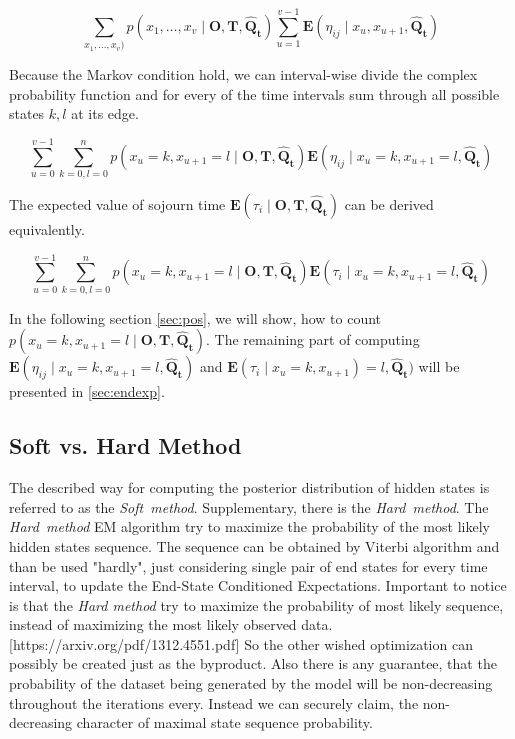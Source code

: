 \documentclass[thesis=M,english]{FITthesis}[2012/10/20]
\newcommand{\matr}[1]{\mathbf{#1}}
\begin{document}
\begin{equation}
 \sum_{x_1,\dots,x_v)} p(x_1,\dots,x_v \mid \matr{O},\matr{T}, \matr{ \hat Q_t }) \sum_{u=1}^{v-1}\mathbf{E}(\eta_{ij} \mid x_u, x_{u+1} ,\matr{\hat Q_t} )
\end{equation}

Because the Markov condition hold, we can interval-wise divide the complex probability function and for every of the time intervals sum through all possible states $k,l$ at its edge. 

\begin{equation}
\sum_{u=0}^{v-1} \sum_{k=0,l=0}^n p( x_u = k, x_{u+1} = l \mid \matr{O},\matr{T}, \matr{ \hat Q_t }) \mathbf{E}(\eta_{ij} \mid x_u = k, x_{u+1} = l, \matr{ \hat Q_t } )
\end{equation}

The expected value of sojourn time $\mathbf{E}( \tau_i \mid \matr{O},\matr{T}, \matr{ \hat Q_t } )$ can be derived equivalently.

\begin{equation}
\sum_{u=0}^{v-1} \sum_{k=0,l=0}^n p( x_u = k, x_{u+1} = l \mid \matr{O},\matr{T}, \matr{ \hat Q_t }) \mathbf{E}(\tau_i \mid x_u = k, x_{u+1} = l,\matr{\hat Q_t} )
\end{equation}

In the following section \ref{sec:pos}, we will show, how to count $p(x_u = k,x_{u+1} = l \mid \matr{O},\matr{T}, \matr{ \hat Q_t })$. The remaining part of computing $\mathbf{E}(\eta_{ij} \mid x_u = k, x_{u+1} = l,\matr{\hat Q_t} )$ and $\mathbf{E}(\tau_i \mid x_u = k, x_{u+1}) = l, \matr{ \hat Q_t } )$ will be presented in \ref{sec:endexp}. 


\subsection{Soft vs. Hard Method}\label{sec:shm}

The described way for computing the posterior distribution of hidden states is referred to as the \textit{Soft~method}. Supplementary, there is the \textit{Hard~method}. The \textit{Hard~method} EM algorithm try to maximize the probability of the most likely hidden states sequence. The sequence can be obtained by Viterbi algorithm and than be used "hardly", just considering single pair of end states for every time interval, to update the End-State Conditioned Expectations. Important to notice is that the \textit{Hard method} try to maximize the probability of most likely sequence, instead of maximizing the most likely observed data. [https://arxiv.org/pdf/1312.4551.pdf] So the other wished optimization can possibly be created just as the byproduct. Also there is any guarantee, that the probability of the dataset being generated by the model will be non-decreasing throughout the iterations every. Instead we can securely claim, the non-decreasing character of maximal state sequence probability.           
\end{document}
